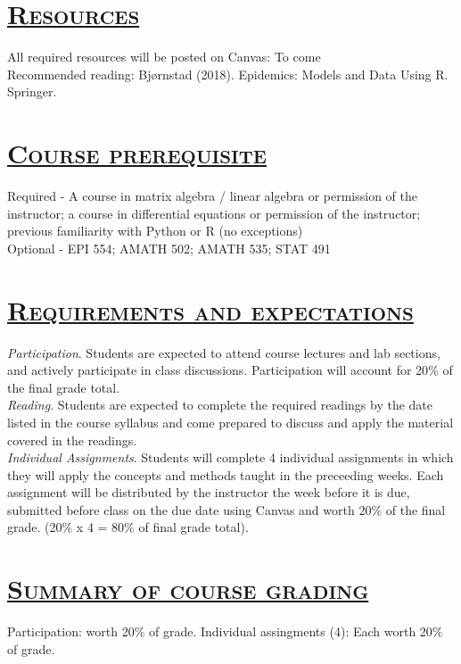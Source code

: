 \documentclass[fancyhdr,10pt]{article}
\begin{document}
\section*{\underline{\textsc{Resources}}}
All required resources will be posted on Canvas: To come\\

Recommended reading: Bj\o rnstad (2018). Epidemics: Models and Data Using R. Springer.

\section*{\underline{\textsc{Course prerequisite}}}
Required - A course in matrix algebra / linear algebra or permission of the instructor; a course in differential equations or permission of the instructor; previous familiarity with Python or R (no exceptions)\\
Optional - EPI 554; AMATH 502; AMATH 535; STAT 491


\section*{\underline{\textsc{Requirements and expectations}}}

\textit{Participation}. Students are expected to attend course lectures and lab sections, and actively participate in class discussions. Participation will account for 20$\%$ of the final grade total.\\

\textit{Reading}. Students are expected to complete the required readings by the date listed in the course syllabus and come prepared to discuss and apply the material covered in the readings.\\

\textit{Individual Assignments}. Students will complete 4 individual assignments in which they will apply the concepts and methods taught in the preceeding weeks. Each assignment will be distributed by the instructor the week before it is due, submitted before class on the due date using Canvas and worth 20$\%$ of the final grade. (20$\%$ x 4 = 80$\%$ of final grade total).\\

\section*{\underline{\textsc{Summary of course grading}}}
Participation: worth 20$\%$ of grade. Individual assingments (4): Each worth 20$\%$ of grade.
\end{document}

